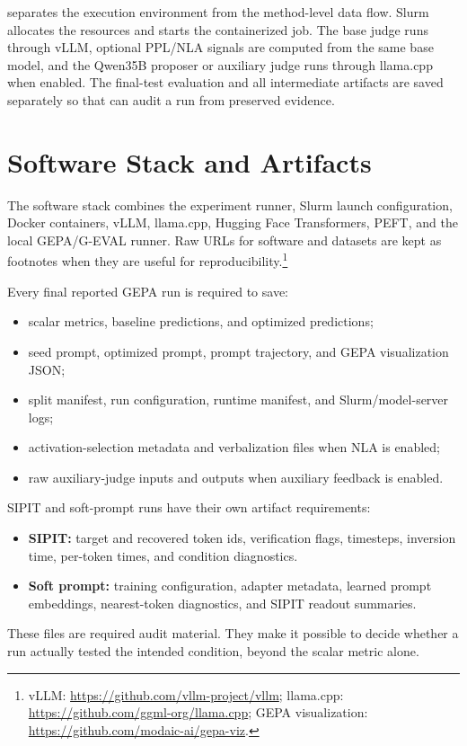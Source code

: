 \documentclass[12pt,a4paper,twoside,openright]{book}
\begin{document}
 separates the execution environment
from the method-level data flow. Slurm allocates the resources and starts the
containerized job. The base judge runs through vLLM, optional PPL/NLA signals
are computed from the same base model, and the Qwen35B proposer or auxiliary
judge runs through llama.cpp when enabled. The final-test evaluation and all
intermediate artifacts are saved separately so that 
can audit a run from preserved evidence.

\section{Software Stack and Artifacts}
\label{sec:setup-software-artifacts}

The software stack combines the experiment runner, Slurm launch configuration,
Docker containers, vLLM, llama.cpp, Hugging Face Transformers, PEFT, and the
local GEPA/G-EVAL runner. Raw URLs for software and datasets are kept as
footnotes when they are useful for reproducibility.\footnote{vLLM:
\url{https://github.com/vllm-project/vllm}; llama.cpp:
\url{https://github.com/ggml-org/llama.cpp}; GEPA visualization:
\url{https://github.com/modaic-ai/gepa-viz}.}

Every final reported GEPA run is required to save:
\begin{itemize}
    \item scalar metrics, baseline predictions, and optimized predictions;
    \item seed prompt, optimized prompt, prompt trajectory, and GEPA
    visualization JSON;
    \item split manifest, run configuration, runtime manifest, and
    Slurm/model-server logs;
    \item activation-selection metadata and verbalization files when NLA is
    enabled;
    \item raw auxiliary-judge inputs and outputs when auxiliary feedback is
    enabled.
\end{itemize}

SIPIT and soft-prompt runs have their own artifact requirements:
\begin{itemize}
    \item \textbf{SIPIT:} target and recovered token ids, verification flags,
    timesteps, inversion time, per-token times, and condition diagnostics.
    \item \textbf{Soft prompt:} training configuration, adapter metadata,
    learned prompt embeddings, nearest-token diagnostics, and SIPIT readout
    summaries.
\end{itemize}
These files are required audit material. They make it possible to decide whether
a run actually tested the intended condition, beyond the scalar metric alone.
\end{document}
